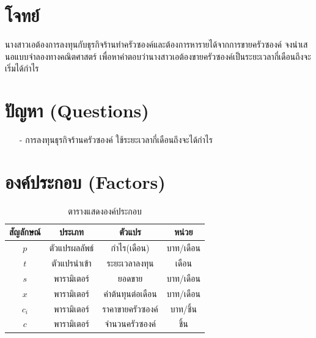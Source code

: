 \documentclass{report}
\begin{document}
\section{โจทย์} 
นางสาวเอต้องการลงทุนกับธุรกิจร้านทำครัวซองค์และต้องการหารายได้จากการขายครัวซองค์ จงนําเสนอแบบจําลองทางคณิตศาสตร์ เพื่อหาคําตอบว่านางสาวเอต้องขายครัวซองค์เป็นระยะเวลากี่เดือนถึงจะเริ่มได้กําไร

\section{ปัญหา (Questions)} 
\begin{itemize}
    \item[-] การลงทุนธุรกิจร้านครัวซองค์ ใช้ระยะเวลากี่เดือนถึงจะได้กำไร
\end{itemize}

\section{องค์ประกอบ (Factors)}
\begin{center}
\begin{table}[!ht]
\centering
\begin{tabular}{ |c|c|c|c| }
\hline
\textbf{สัญลักษณ์ } & \textbf{ประเภท } & \textbf{ตัวแปร } & \textbf{หน่วย } \\
\hline
$p$ & ตัวแปรผลลัพธ์ & กําไร(เดือน) & บาท/เดือน \\
\hline
$t$ & ตัวแปรนำเข้า & ระยะเวลาลงทุน & เดือน \\
\hline
$s$ & พารามิเตอร์ & ยอดขาย & บาท/เดือน \\
\hline
$x$ & พารามิเตอร์ & ค่าต้นทุนต่อเดือน & บาท/เดือน \\
\hline
$c_i$ & พารามิเตอร์ & ราคาขายครัวซองค์ & บาท/ชิ้น \\
\hline
$c$ & พารามิเตอร์ & จํานวนครัวซองค์ & ชิ้น \\
\hline
\end{tabular}
\caption{ตารางแสดงองค์ประกอบ}
\label{table : 1}
\end{table}
\end{center}
 
\pagebreak
\end{document}
